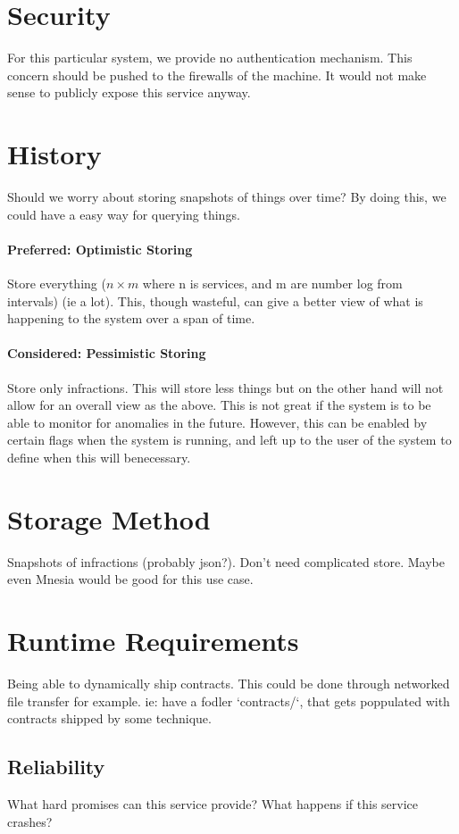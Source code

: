 \documentclass[12pt,twoside]{article}
\begin{document}
\section{Security}
For this particular system, we provide no authentication
mechanism. This concern should be pushed to the firewalls of the
machine. It would not make sense to publicly expose this service
anyway.

\section{History}
Should we worry about storing snapshots of things over time? By
doing this, we could have a easy way for querying things.

\paragraph{Preferred: Optimistic Storing}
Store everything ($n \times m$ where n is services, and m are number log
from intervals) (ie a lot). This, though wasteful, can give a
better view of what is happening to the system over a span of
time.

\paragraph{Considered: Pessimistic Storing}
Store only infractions. This will store less things but on the
other hand will not allow for an overall view as the above. This is
not great if the system is to be able to monitor for anomalies in the
future. However, this can be enabled by certain flags when the system
is running, and left up to the user of the system to define when this
will benecessary.

\section{Storage Method}
Snapshots of infractions (probably json?). Don't need complicated
store. Maybe even Mnesia would be good for this use case.

\section{Runtime Requirements}
Being able to dynamically ship contracts. This could be done
through networked file transfer for example. ie: have a fodler
`contracts/`, that gets poppulated with contracts shipped by some
technique.

\subsection{Reliability}
What hard promises can this service provide?
What happens if this service crashes?
\end{document}

